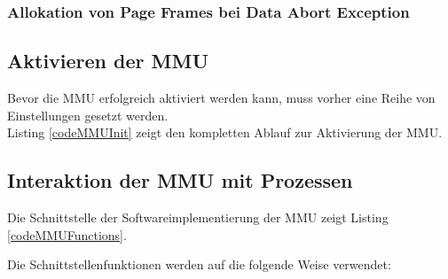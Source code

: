 \subsubsection{Allokation von Page Frames bei Data Abort Exception}

\subsection{Aktivieren der MMU}
\label{subsect:activateMMU}

Bevor die MMU erfolgreich aktiviert werden kann, muss vorher eine Reihe von Einstellungen gesetzt werden.\\


Listing \ref{codeMMUInit} zeigt den kompletten Ablauf zur Aktivierung der MMU.




\subsection{Interaktion der MMU mit Prozessen}

Die Schnittstelle der Softwareimplementierung der MMU zeigt Listing \ref{codeMMUFunctions}.\\


\vspace{0.5cm}

Die Schnittstellenfunktionen werden auf die folgende Weise verwendet: 

